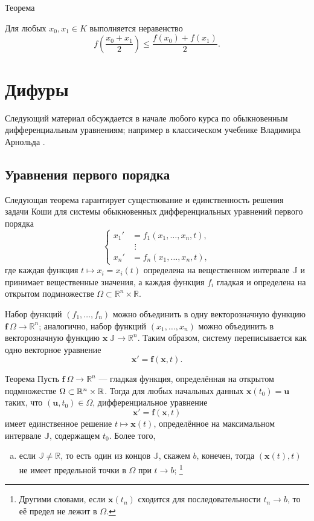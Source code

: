 \begin{multicols}{2}
{\begin{thm}{Теорема}
\begin{subthm}{}
\end{subthm}

\begin{subthm}{}
Для любых $x_0,x_1\in K$ выполняется неравенство
\[f \left (\frac{x_0 + x_1}2 \right ) \le \frac{f(x_0) + f(x_1)}2.\]
\end{subthm}

\end{thm}

\section[Дифференциальные уравнения]{Дифуры}

{\sloppy

Следующий материал обсуждается в начале любого курса по обыкновенным дифференциальным уравнениям;
например в классическом учебнике Владимира Арнольда \cite{arnold}.

}

\subsection*{Уравнения первого порядка}

Следующая теорема гарантирует существование и единственность решения задачи Коши для системы обыкновенных дифференциальных уравнений первого порядка
\[
\begin{cases}
x_1'&=f_1(x_1,\dots,x_n,t),
\\
&\,\,\vdots
\\
x_n'&=f_n(x_1,\dots,x_n,t),
\end{cases}
\]
где каждая функция $t\mapsto x_i=x_i(t)$ определена на вещественном интервале $\mathbb{J}$ и принимает вещественные значения, а каждая функция $f_i$ гладкая и определена на открытом подмножестве $\Omega\subset \mathbb{R}^n\times \mathbb{R}$.

Набор функций $(f_1,\dots,f_n)$ можно объединить в одну векторозначную функцию $\bm{f}\:\Omega\to \mathbb{R}^n$; аналогично, набор функций $(x_1,\dots,x_n)$ можно объединить в векторозначную функцию $\bm{x}\:\mathbb{J}\to\mathbb{R}^n$.
Таким образом, систему переписывается как одно векторное уравнение
\[\bm{x}'=\bm{f}(\bm{x}, t).\]

\begin{thm}{Теорема}\label{thm:ODE}
Пусть $\bm{f}\:\Omega\to \mathbb{R}^n$ --- гладкая функция, определённая на открытом подмножестве $\Omega\z\subset \mathbb{R}^n\z\times \mathbb{R}$.
Тогда для любых начальных данных $\bm{x}(t_0)=\bm{u}$ таких, что $(\bm{u},t_0)\in\Omega$, дифференциальное уравнение
\[\bm{x}'=\bm{f}(\bm{x},t)\]
имеет единственное решение $t\mapsto \bm{x}(t)$, определённое на максимальном интервале $\mathbb{J}$, содержащем $t_0$.
Более того,
\begin{enumerate}[(a)]
\item если $\mathbb{J}\ne \mathbb{R}$, то есть один из концов $\mathbb{J}$, скажем $b$, конечен, тогда $(\bm{x}(t),t)$ не имеет предельной точки в $\Omega$ при $t\to b$;%
\footnote{Другими словами, если $\bm{x}(t_n)$ сходится для последовательности $t_n\to b$, то её предел не лежит в $\Omega$.}


\end{enumerate}
\end{thm}}
\end{multicols}
